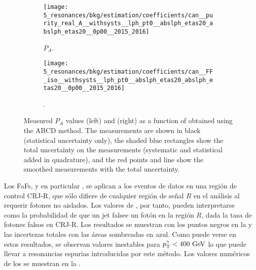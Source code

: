 \begin{figure}[ht!]
    \centering
    \begin{subfigure}[h]{0.49\linewidth}
        \centering
        \texttt{[image: 5\_resonances/bkg/estimation/coefficients/can\_\_purity\_real\_A\_\_withsysts\_\_lph\_pt0\_\_abslph\_etas20\_abslph\_etas20\_\_0p00\_\_2015\_2016]}
        \caption{\(P_A\).}
        \label{fig:bkg:estimation:results:results:purities}
    \end{subfigure}
    \hfill
    \begin{subfigure}[h]{0.49\linewidth}
        \centering
        \texttt{[image: 5\_resonances/bkg/estimation/coefficients/can\_\_FF\_iso\_\_withsysts\_\_lph\_pt0\_\_abslph\_etas20\_abslph\_etas20\_\_0p00\_\_2015\_2016]}
        \caption{\ffiso.}
        \label{fig:bkg:estimation:results:results:ffiso}
    \end{subfigure}
    \caption{Measured \gammajet \(P_A\) values (left) and \ffiso (right) as a function of \ptgam obtained using the ABCD method. The measurements are shown in black (statistical uncertainty only), the shaded blue rectangles show the total uncertainty on the measurements (systematic and statistical added in quadrature), and the red points and line show the smoothed measurements with the total uncertainty.}
    \label{fig:bkg:estimation:results:results}
\end{figure}


Los \acp{FaF}, y en particular \ffiso, se aplican a los eventos de datos en una región de control CRJ-R, que sólo difiere de cualquier región de señal \(R\) en el análisis al requerir fotones no aislados. Los valores de \ffiso, por tanto, pueden interpretarse como la probabilidad de que un jet falsee un fotón en la región \(R\), dada la tasa de fotones falsos en CRJ-R. Los resultados se muestran con los puntos negros en la \Fig{\ref{fig:bkg:estimation:results:results:ffiso}} y las incertezas totales con las áreas sombreadas en azul. Como puede verse en estos resultados, se observan valores \ffiso inestables para \(p_{\text{T}}^{\gamma}<400~\text{GeV}\) lo que puede llevar a resonancias espurias introducidas por este método. Los valores numéricos de los \ffiso se muestran en la \Tab{\ref{tab:bkg:estimation:results:ffiso_purity_values}}.